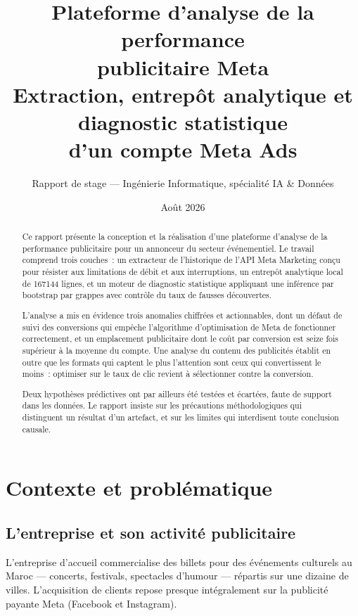 \documentclass[11pt,a4paper]{article}
\title{\vspace{-1.5cm}\textbf{Plateforme d'analyse de la performance\\publicitaire Meta}\\[0.3cm]
\large Extraction, entrepôt analytique et diagnostic statistique\\d'un compte Meta Ads}
\author{Rapport de stage --- Ingénierie Informatique, spécialité IA \& Données}
\date{Août 2026}
\begin{document}
\maketitle
\thispagestyle{empty}

\begin{abstract}
\noindent
Ce rapport présente la conception et la réalisation d'une plateforme d'analyse
de la performance publicitaire pour un annonceur du secteur événementiel. Le
travail comprend trois couches~: un extracteur de l'historique de l'API Meta
Marketing conçu pour résister aux limitations de débit et aux interruptions, un
entrepôt analytique local de \num{167144} lignes, et un moteur de diagnostic
statistique appliquant une inférence par bootstrap par grappes avec contrôle du
taux de fausses découvertes.

L'analyse a mis en évidence trois anomalies chiffrées et actionnables, dont un
défaut de suivi des conversions qui empêche l'algorithme d'optimisation de Meta
de fonctionner correctement, et un emplacement publicitaire dont le coût par
conversion est seize fois supérieur à la moyenne du compte. Une analyse du
contenu des publicités établit en outre que les formats qui captent le plus
l'attention sont ceux qui convertissent le moins~: optimiser sur le taux de
clic revient à sélectionner contre la conversion.

Deux hypothèses prédictives ont par ailleurs été testées et écartées, faute de
support dans les données. Le rapport insiste sur les précautions
méthodologiques qui distinguent un résultat d'un artefact, et sur les limites
qui interdisent toute conclusion causale.
\end{abstract}

\vspace{0.5cm}
\tableofcontents
\newpage

\section{Contexte et problématique}

\subsection{L'entreprise et son activité publicitaire}

L'entreprise d'accueil commercialise des billets pour des événements culturels
au Maroc --- concerts, festivals, spectacles d'humour --- répartis sur une
dizaine de villes. L'acquisition de clients repose presque intégralement sur la
publicité payante Meta (Facebook et Instagram).
\end{document}
